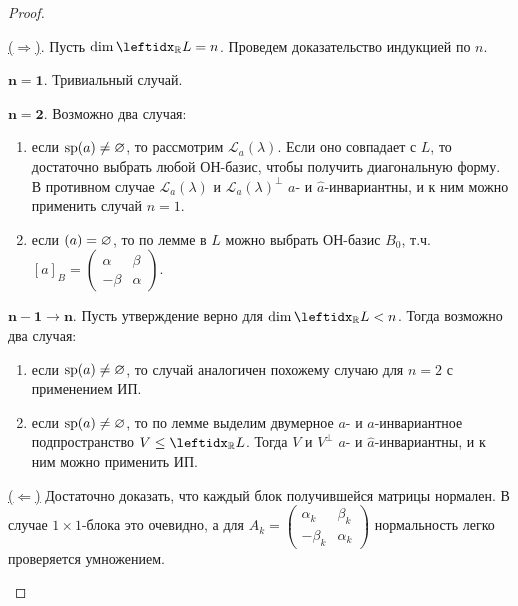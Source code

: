 \begin{proof}
    \begin{proofpart}
        \underline{($\Rightarrow$)}. Пусть $\dim \lsub{\mathbb{R}}{L} = n$. Проведем доказательство индукцией по $n$.
        \smallskip
        
        $\mathbf{n = 1}$. Тривиальный случай.
        
        $\mathbf{n = 2}$. Возможно два случая:
        \begin{enumerate}
            \item если $\operatorname{sp}(a) \neq \varnothing$, то рассмотрим $\mathcal{L}_a(\lambda)$. Если оно совпадает с $L$, то достаточно выбрать любой ОН-базис, чтобы получить диагональную форму. В противном случае $\mathcal{L}_a(\lambda)$ и $\mathcal{L}_a(\lambda)^\perp$ $a$- и $\hat{a}$-инвариантны, и к ним можно применить случай $n = 1$.
            \item если $\space(a) = \varnothing$, то по лемме в $L$ можно выбрать ОН-базис $B_0$, т.ч. $[a]_B = \begin{pmatrix}
                \alpha & \beta \\
                -\beta & \alpha
            \end{pmatrix}$.
        \end{enumerate}
    
        $\mathbf{n - 1 \to n}$. Пусть утверждение верно для $\dim \lsub{\mathbb{R}}{L} < n$. Тогда возможно два случая:
        \begin{enumerate}
            \item если $\operatorname{sp}(a) \neq \varnothing$, то случай аналогичен похожему случаю для $n = 2$ с применением ИП.
            \item если $\operatorname{sp}(a) \neq \varnothing$, то по лемме выделим двумерное $a$- и $\hat{a}$-инвариантное подпространство $V \le \lsub{\mathbb{R}}{L}$. Тогда $V$ и $V^\perp$ $a$- и $\hat{a}$-инвариантны, и к ним можно применить ИП.
        \end{enumerate}
        \smallskip
        
        \underline{($\Leftarrow$)} Достаточно доказать, что каждый блок получившейся матрицы нормален. В случае $1 \times 1$-блока это очевидно, а для $A_k = \begin{pmatrix}
            \alpha_k & \beta_k \\
            -\beta_k & \alpha_k
        \end{pmatrix}$ нормальность легко проверяется умножением.
    \end{proofpart}


\end{proof}
